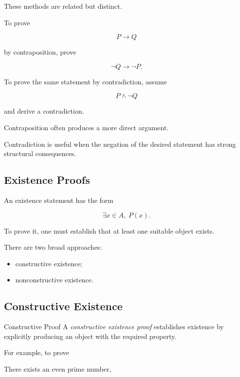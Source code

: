 These methods are related but distinct.

To prove

\[ P\to Q \]

by contraposition, prove

\[ \neg Q\to\neg P. \]

To prove the same statement by contradiction, assume

\[ P\land\neg Q \]

and derive a contradiction.

Contraposition often produces a more direct argument.

Contradiction is useful when the negation of the desired statement has strong
structural consequences.

\subsection{Existence Proofs}
\label{subsec:existence-proofs}

An existence statement has the form

\[ \exists x\in A,\;P(x). \]

To prove it, one must establish that at least one suitable object exists.

There are two broad approaches:

\begin{itemize}
    \item constructive existence;
    \item nonconstructive existence.
\end{itemize}

\subsection{Constructive Existence}
\label{subsec:constructive-existence}

\begin{definitionbox}{Constructive Proof}
A \emph{constructive existence proof} establishes existence by explicitly
producing an object with the required property.
\end{definitionbox}

For example, to prove

\begin{center}
There exists an even prime number,
\end{center}

